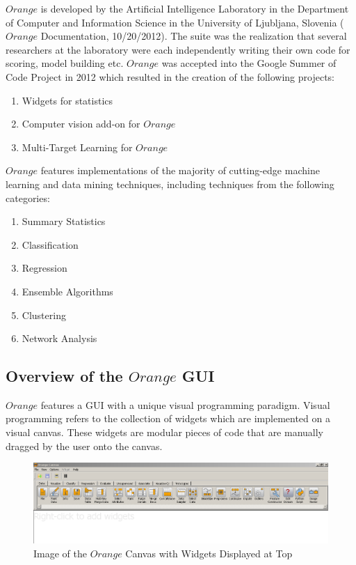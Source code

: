 \begin{flushleft}
$Orange$  is developed by the Artificial Intelligence Laboratory in the Department of Computer and Information Science in the University of Ljubljana, Slovenia ($Orange$ Documentation, 10/20/2012). The suite was the realization that several researchers at the laboratory were each independently writing their own code for scoring, model building etc. $Orange$ was accepted into the Google Summer of Code Project in 2012 which resulted in the creation of the following projects:
\end{flushleft}
\begin{enumerate}
\item Widgets for statistics
\item Computer vision add-on for $Orange$
\item Multi-Target Learning for $Orange$
\end{enumerate}

\begin{flushleft}$Orange$ features implementations of the majority of cutting-edge machine learning and data mining techniques, including techniques from the following categories:
\end{flushleft}

\begin{enumerate}
\item Summary Statistics
\item Classification
\item Regression
\item Ensemble Algorithms
\item Clustering
\item Network Analysis
\end{enumerate}

\subsection{Overview of the $Orange$ GUI}

\begin{flushleft}$Orange$ features a GUI with a unique visual programming paradigm. Visual programming refers to the collection of widgets which are implemented on a visual canvas. These widgets are modular pieces of code that are manually dragged by the user onto the canvas. 
\end{flushleft}

\begin{figure}[H]
    \centering
       \includegraphics[width=6.5 in]{orange_canvas.PNG}
    \caption{Image of the $Orange$ Canvas with Widgets Displayed at Top}
\end{figure}

